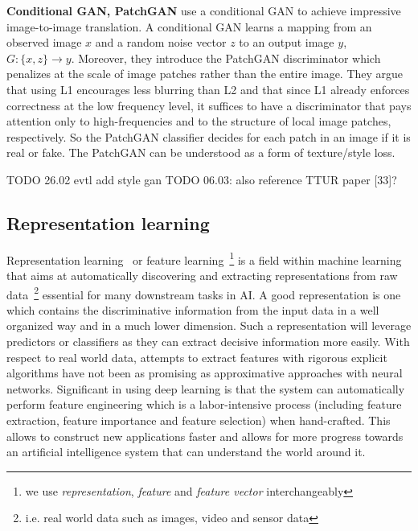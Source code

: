 \documentclass[12pt,a4paper]{article}
\begin{document}
\par \textbf{Conditional GAN, PatchGAN} \cite{CondGAN_PatchGAN} use a conditional GAN to achieve impressive image-to-image translation. A conditional GAN learns a mapping from an observed image $x$ and a random noise vector $z$ to an output image $y$, $G : \{x,z\} \rightarrow y$. Moreover, they introduce the PatchGAN discriminator which penalizes at the scale of image patches rather than the entire image. They argue that using L1 encourages less blurring than L2 and that since L1 already enforces correctness at the low frequency level, it suffices to have a discriminator that pays attention only to high-frequencies and to the structure of local image patches, respectively. So the PatchGAN classifier decides for each patch in an image if it is real or fake. The PatchGAN can be understood as a form of texture/style loss.

TODO 26.02 evtl add style gan
TODO 06.03: also reference TTUR paper [33]?

\subsection{Representation learning}
Representation learning~\cite{ReprLearning} or feature learning~\footnote{we use \textit{representation}, \textit{feature} and \textit{feature vector} interchangeably} is a field within machine learning that aims at automatically discovering and extracting representations from raw data~\footnote{i.e. real world data such as images, video and sensor data} essential for many downstream tasks in AI. A good representation is one which contains the discriminative information from the input data in a well organized way and in a much lower dimension. Such a representation will leverage predictors or classifiers as they can extract decisive information more easily. With respect to real world data, attempts to extract features with rigorous explicit algorithms have not been as promising as approximative approaches with neural networks. Significant in using deep learning is that the system can automatically perform feature engineering which is a labor-intensive process (including feature extraction, feature importance and feature selection) when hand-crafted. This allows to construct new applications faster and allows for more progress towards an artificial intelligence system that can understand the world around it.  
\end{document}
